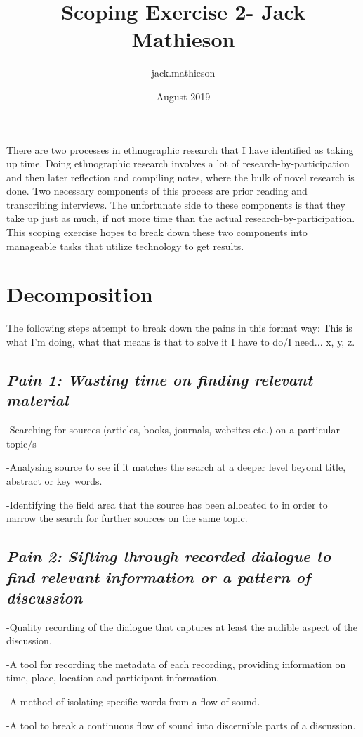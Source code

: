 \documentclass{article}
\title{Scoping Exercise 2- Jack Mathieson}
\author{jack.mathieson }
\date{August 2019}
\begin{document}
\maketitle
There are two processes in ethnographic research that I have identified as taking up time. Doing ethnographic research involves a lot of research-by-participation and then later reflection and compiling notes, where the bulk of novel research is done. Two necessary components of this process are prior reading and transcribing interviews. The unfortunate side to these components is that they take up just as much, if not more time than the actual research-by-participation. This scoping exercise hopes to break down these two components into manageable tasks that  utilize technology to get results.
\section*{Decomposition}
The following steps attempt to break down the pains in this format way: This is what I'm doing, what that means is that to solve it I have to do/I need... x, y, z.
\subsection*{\textit{Pain 1: Wasting time on finding relevant material}}
-Searching for sources (articles, books, journals, websites etc.) on a particular topic/s

-Analysing source to see if it matches the search at a deeper level beyond title, abstract or key words.

-Identifying the field area that the source has been allocated to in order to narrow the search for further sources on the same topic.

\subsection*{\textit{Pain 2: Sifting through recorded dialogue to find relevant information or a pattern of discussion}}
-Quality recording of the dialogue that captures at least the audible aspect of the discussion.

-A tool for recording the metadata of each recording, providing information on time, place, location and participant information.

-A method of isolating specific words from a flow of sound.

-A tool to break a continuous flow of sound into discernible parts of a discussion.
\end{document}
